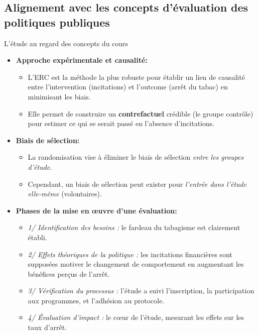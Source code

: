 \documentclass[aspectratio=169,xcolor=dvipsnames]{beamer}
\begin{document}
\subsection{Alignement avec les concepts d'évaluation des politiques publiques}

\begin{frame}{L'étude au regard des concepts du cours}
    \begin{itemize}
        \item \textbf{Approche expérimentale et causalité:}
            \begin{itemize}
                \item L'ERC est la méthode la plus robuste pour établir un lien de causalité entre l'intervention (incitations) et l'outcome (arrêt du tabac) en minimisant les biais.
                \item Elle permet de construire un \textbf{contrefactuel} crédible (le groupe contrôle) pour estimer ce qui se serait passé en l'absence d'incitations.
            \end{itemize}
        \item \textbf{Biais de sélection:}
            \begin{itemize}
                \item La randomisation vise à éliminer le biais de sélection \textit{entre les groupes d'étude}.
                \item Cependant, un biais de sélection peut exister pour \textit{l'entrée dans l'étude elle-même} (volontaires).
            \end{itemize}
        \item \textbf{Phases de la mise en œuvre d'une évaluation:}
            \begin{itemize}
                \item \textit{1/ Identification des besoins :} le fardeau du tabagisme est clairement établi.
                \item \textit{2/ Effets théoriques de la politique :} les incitations financières sont supposées motiver le changement de comportement en augmentant les bénéfices perçus de l'arrêt.
                \item \textit{3/ Vérification du processus :} l'étude a suivi l'inscription, la participation aux programmes, et l'adhésion au protocole.
                \item \textit{4/ Évaluation d'impact :} le cœur de l'étude, mesurant les effets sur les taux d'arrêt.
            \end{itemize}

\end{itemize}
\end{frame}
\end{document}
